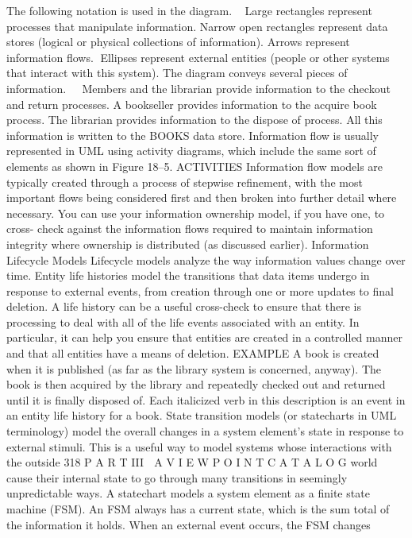 The following notation is used in the diagram.
Large rectangles represent processes that manipulate information.
Narrow open rectangles represent data stores (logical or physical
collections of information).
Arrows represent information flows.
Ellipses represent external entities (people or other systems that interact
with this system).
The diagram conveys several pieces of information.
Members and the librarian provide information to the checkout and
return processes.
A bookseller provides information to the acquire book process.
The librarian provides information to the dispose of process.
All this information is written to the BOOKS data store.
Information flow is usually represented in UML using activity diagrams,
which include the same sort of elements as shown in Figure 18–5.
ACTIVITIES Information flow models are typically created through a process
of stepwise refinement, with the most important flows being considered first
and then broken into further detail where necessary.
You can use your information ownership model, if you have one, to cross-
check against the information flows required to maintain information integrity
where ownership is distributed (as discussed earlier).
Information Lifecycle Models
Lifecycle models analyze the way information values change over time.
Entity life histories model the transitions that data items undergo in response
to external events, from creation through one or more updates to final deletion. A
life history can be a useful cross-check to ensure that there is processing to deal
with all of the life events associated with an entity. In particular, it can help you
ensure that entities are created in a controlled manner and that all entities have a
means of deletion.
EXAMPLE A book is created when it is published (as far as the library
system is concerned, anyway). The book is then acquired by the library
and repeatedly checked out and returned until it is finally disposed of.
Each italicized verb in this description is an event in an entity life
history for a book.
State transition models (or statecharts in UML terminology) model the
overall changes in a system element’s state in response to external stimuli.
This is a useful way to model systems whose interactions with the outside
318
 P A R T III  A V I E W P O I N T C A T A L O G
world cause their internal state to go through many transitions in seemingly
unpredictable ways. A statechart models a system element as a finite state
machine (FSM). An FSM always has a current state, which is the sum total of
the information it holds. When an external event occurs, the FSM changes
